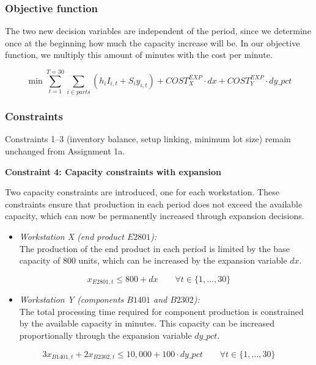 \documentclass[a4paper,faculty=eb,language=en,doctype=article,sftitles=false]{ugent-doc}
\begin{document}
\subsubsection{Objective function}

The two new decision variables are independent of the period, since we determine once at the beginning how much the capacity increase will be. In our objective function, we multiply this amount of minutes with the cost per minute.

\[
\min \sum_{t=1}^{T=30} \sum_{i \in parts}
\left(h_i I_{i,t} + S_i y_{i,t}\right)
+ COST^{EXP}_{X} \cdot dx
+ COST^{EXP}_{Y} \cdot dy\_pct
\]

\subsubsection{Constraints}

Constraints 1--3 (inventory balance, setup linking, minimum lot size) remain unchanged from Assignment 1a.

\vspace{0.5em}
\textbf{Constraint 4: Capacity constraints with expansion}

Two capacity constraints are introduced, one for each workstation. These constraints ensure that production in each period does not exceed the available capacity, which can now be permanently increased through expansion decisions.

\begin{itemize}
    \item \textit{Workstation X (end product $E2801$):} \\
    The production of the end product in each period is limited by the base capacity of 800 units, which can be increased by the expansion variable $dx$.
\end{itemize}

\[
x_{E2801,t} \leq 800 + dx 
\qquad \forall t \in \{1,\ldots,30\}
\]

\begin{itemize}
    \item \textit{Workstation Y (components $B1401$ and $B2302$):} \\
    The total processing time required for component production is constrained by the available capacity in minutes. This capacity can be increased proportionally through the expansion variable $dy\_pct$.
\end{itemize}

\[
3x_{B1401,t} + 2x_{B2302,t}
\leq 10{,}000 + 100 \cdot dy\_pct
\qquad \forall t \in \{1,\ldots,30\}
\]
\end{document}
